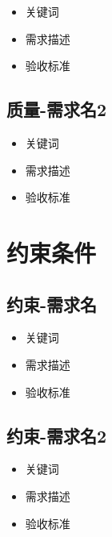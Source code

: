 \documentclass[hyperref, a4paper]{ctexart}
\providecommand{\tightlist}{%
  \setlength{\itemsep}{0pt}\setlength{\parskip}{0pt}}
\begin{document}
\begin{itemize}
\tightlist
\item
  关键词
\item
  需求描述
\item
  验收标准
\end{itemize}

\hypertarget{ux8d28ux91cf-ux9700ux6c42ux540d2}{%
\subsection{质量-需求名2}\label{ux8d28ux91cf-ux9700ux6c42ux540d2}}

\begin{itemize}
\tightlist
\item
  关键词
\item
  需求描述
\item
  验收标准
\end{itemize}

\hypertarget{ux7ea6ux675fux6761ux4ef6}{%
\section{约束条件}\label{ux7ea6ux675fux6761ux4ef6}}

\hypertarget{ux7ea6ux675f-ux9700ux6c42ux540d}{%
\subsection{约束-需求名}\label{ux7ea6ux675f-ux9700ux6c42ux540d}}

\begin{itemize}
\tightlist
\item
  关键词
\item
  需求描述
\item
  验收标准
\end{itemize}

\hypertarget{ux7ea6ux675f-ux9700ux6c42ux540d2}{%
\subsection{约束-需求名2}\label{ux7ea6ux675f-ux9700ux6c42ux540d2}}

\begin{itemize}
\tightlist
\item
  关键词
\item
  需求描述
\item
  验收标准
\end{itemize}

\pagebreak
\end{document}
